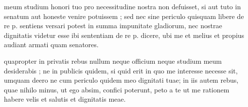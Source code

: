 


 meum studium honori tuo pro necessitudine nostra non defuisset, si aut tuto in senatum aut honeste venire potuissem ; sed nec sine periculo quisquam libere de re p. sentiens versari potest in summa impunitate gladiorum, nec nostrae dignitatis videtur esse ibi sententiam de re p. dicere, ubi me et melius et propius audiant armati quam senatores.

 quapropter in privatis rebus nullum neque officium neque studium meum desiderabis ; ne in publicis quidem, si quid erit in quo me interesse necesse sit, umquam deero ne cum periculo quidem meo dignitati tuae; in iis autem rebus, quae nihilo minus, ut ego absim, confici poterunt, peto a te ut me rationem habere velis et salutis et dignitatis meae.
